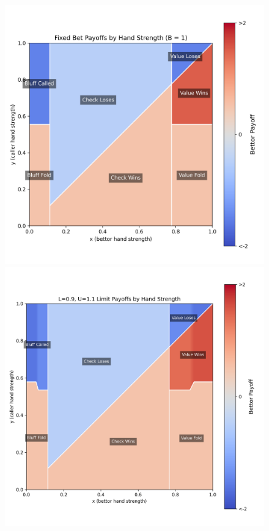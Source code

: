 \documentclass[a4paper,12pt]{article}
\theoremstyle{plain}
\theoremstyle{definition}
\begin{document}
\begin{figure}[h!]
    \begin{adjustwidth}{-1in}{-1in}
        \vspace{-3cm} %
        \centering
        \begin{minipage}{0.55\textwidth}
            \centering
            \includegraphics[width=\textwidth]{payoff_fixed_bet_heatmap.png}
        \end{minipage}
        \hspace{0.05\textwidth}
        \begin{minipage}{0.55\textwidth}
            \centering
            \includegraphics[width=\textwidth]{LU_payoffs_0.9_1.1.png}

\end{minipage}
\end{adjustwidth}
\end{figure}
\end{document}
